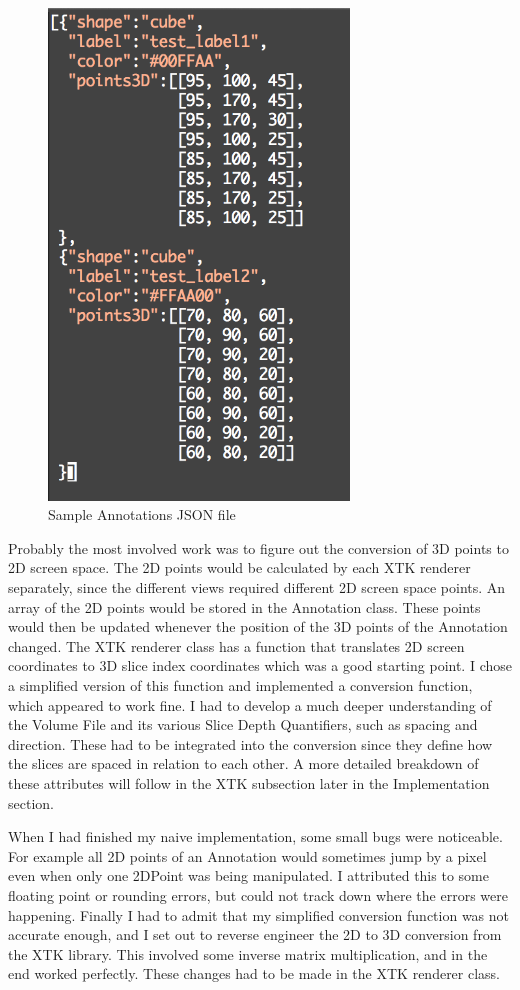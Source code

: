 \documentclass[a4paper,11pt,twoside]{article}
\begin{document}
\begin{figure}[ht!]
\centering
\includegraphics[width=80mm]{graphics/AnnoJSON_01.png}
\caption{Sample Annotations JSON file}
\label{fig:UIdesign1}
\end{figure}



Probably the most involved work was to figure out the conversion of 3D points to 2D screen space. The 2D points would be calculated by each XTK renderer separately, since the different views required different 2D screen space points. An array of the 2D points would be stored in the Annotation class. These points would then be updated whenever the position of the 3D points of the Annotation changed. The XTK renderer class has a function that translates 2D screen coordinates to 3D slice index coordinates which was a good starting point. I chose a simplified version of this function and implemented a conversion function, which appeared to work fine. I had to develop a much deeper understanding of the Volume File and its various Slice Depth Quantifiers, such as spacing and direction. These had to be integrated into the conversion since they define how the slices are spaced in relation to each other. A more detailed breakdown of these attributes will follow in the XTK subsection later in the Implementation section.


When I had finished my naive implementation, some small bugs were noticeable. For example all 2D points of an Annotation would sometimes jump by a pixel even when only one 2DPoint was being manipulated. I attributed this to some floating point or rounding errors, but could not track down where the errors were happening. Finally I had to admit that my simplified conversion function was not accurate enough, and I set out to reverse engineer the 2D to 3D conversion from the XTK library. This involved some inverse matrix multiplication, and in the end worked perfectly. These changes had to be made in the XTK renderer class.
\end{document}
